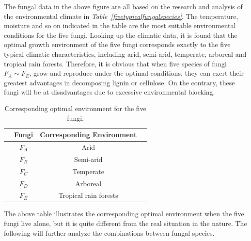 The fungal data in the above figure are all based on the research and analysis of the environmental climate in \textit{Table~\ref{fivetypicalfungalspecies}}. The temperature, moisture and so on indicated in the table are the most suitable environmental conditions for the five fungi. Looking up the climatic data, it is found that the optimal growth environment of the five fungi corresponds exactly to the five typical climatic characteristics, including arid, semi-arid, temperate, arboreal and tropical rain forests. Therefore, it is obvious that when five species of fungi $F_A\sim F_E$, grow and reproduce under the optimal conditions, they can exert their greatest advantages in decomposing lignin or cellulose. On the contrary, these fungi will be at disadvantages due to excessive environmental blocking.
\begin{table}[H]
  \centering
  \caption{Corresponding optimal environment for the five fungi.}
  \label{correspondingoptimalenvironment}
  \begin{tabular*}{\hsize}{@{\extracolsep{\fill}}cccc}
    \toprule
    & Fungi & Corresponding Environment & \\
    \midrule
    & $F_A$ & Arid & \\
    & $F_B$ & Semi-arid & \\
    & $F_C$ & Temperate & \\
    & $F_D$ & Arboreal & \\
    & $F_E$ & Tropical rain forests & \\
    \bottomrule
  \end{tabular*}
\end{table}
The above table illustrates the corresponding optimal environment when the five fungi live alone, but it is quite different from the real situation in the nature. The following will further analyze the combinations between fungal species.